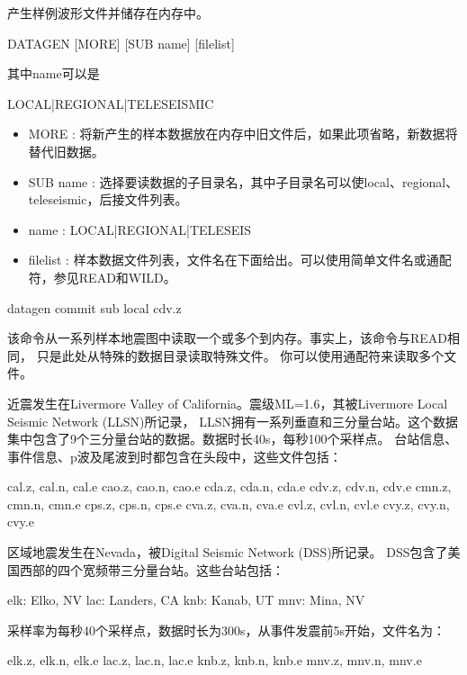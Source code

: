 \label{cmd:datagen}

产生样例波形文件并储存在内存中。

\begin{SACSTX}
DATAGEN [MORE] [SUB name] [filelist]
\end{SACSTX}
其中name可以是
\begin{SACSTX}
LOCAL|REGIONAL|TELESEISMIC
\end{SACSTX}

\begin{itemize}
\item MORE : 将新产生的样本数据放在内存中旧文件后，如果此项省略，新数据将替代旧数据。
\item SUB name : 选择要读数据的子目录名，其中子目录名可以使local、regional、teleseismic，后接文件列表。
\item name : LOCAL|REGIONAL|TELESEIS
\item filelist : 样本数据文件列表，文件名在下面给出。可以使用简单文件名或通配符，参见READ和WILD。
\end{itemize}

\begin{SACDFT}
datagen commit sub local cdv.z
\end{SACDFT}

该命令从一系列样本地震图中读取一个或多个到内存。事实上，该命令与READ相同，
只是此处从特殊的数据目录读取特殊文件。
你可以使用通配符来读取多个文件。

近震发生在Livermore Valley of California。震级ML=1.6，其被Livermore Local Seismic Network (LLSN)所记录，
LLSN拥有一系列垂直和三分量台站。这个数据集中包含了9个三分量台站的数据。数据时长40s，每秒100个采样点。
台站信息、事件信息、p波及尾波到时都包含在头段中，这些文件包括：
\begin{SACCode}
    cal.z, cal.n, cal.e
    cao.z, cao.n, cao.e
    cda.z, cda.n, cda.e
    cdv.z, cdv.n, cdv.e
    cmn.z, cmn.n, cmn.e
    cps.z, cps.n, cps.e
    cva.z, cva.n, cva.e
    cvl.z, cvl.n, cvl.e
    cvy.z, cvy.n, cvy.e
\end{SACCode}

区域地震发生在Nevada，被Digital Seismic Network (DSS)所记录。 DSS包含了美国西部的四个宽频带三分量台站。这些台站包括：
\begin{SACCode}
    elk: Elko, NV
    lac: Landers, CA
    knb: Kanab, UT
    mnv: Mina, NV
\end{SACCode}
采样率为每秒40个采样点，数据时长为300s，从事件发震前5s开始，文件名为：
\begin{SACCode}
    elk.z, elk.n, elk.e
    lac.z, lac.n, lac.e
    knb.z, knb.n, knb.e
    mnv.z, mnv.n, mnv.e
\end{SACCode}

